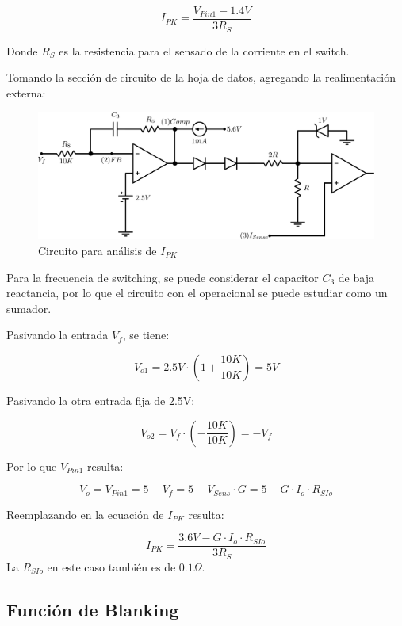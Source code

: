 \documentclass[e4_tp2_main.tex]{subfiles}
\begin{document}
\[
I_{PK} = \frac{V_{Pin1} - 1.4V}{3R_S}
\]

Donde $R_S$ es la resistencia para el sensado de la corriente en el switch.

Tomando la sección de circuito de la hoja de datos, agregando la realimentación externa:

\begin{figure}[H]
\centering
\includegraphics[width=0.8\linewidth]{Imagenes/Punto2/IPK-Circuito.png}
\caption{Circuito para análisis de $I_{PK}$}
\end{figure}

Para la frecuencia de switching, se puede considerar el capacitor $C_3$ de baja reactancia, por lo que el circuito con el operacional se puede estudiar como un sumador.\par
Pasivando la entrada $V_{f}$, se tiene:

\[
V_{o1} = 2.5V \cdot \left(1+ \frac{10K}{10K}\right) = 5V 
\]

Pasivando la otra entrada fija de 2.5V:

\[
V_{o2} = V_{f} \cdot \left(- \frac{10K}{10K} \right) = -V_{f}
\]

Por lo que $V_{Pin1}$ resulta:

\[
V_{o} = V_{Pin1} = 5 - V_{f} = 5 - V_{Sens} \cdot G = 5 - G \cdot I_o \cdot R_{SIo}
\]

Reemplazando en la ecuación de $I_{PK}$ resulta:

\[
I_{PK} = \frac{3.6V - G \cdot I_o \cdot R_{SIo}}{3R_S}
\]
La $R_{SIo}$ en este caso también es de $0.1\Omega$.

\subsection*{Función de Blanking}
\end{document}
